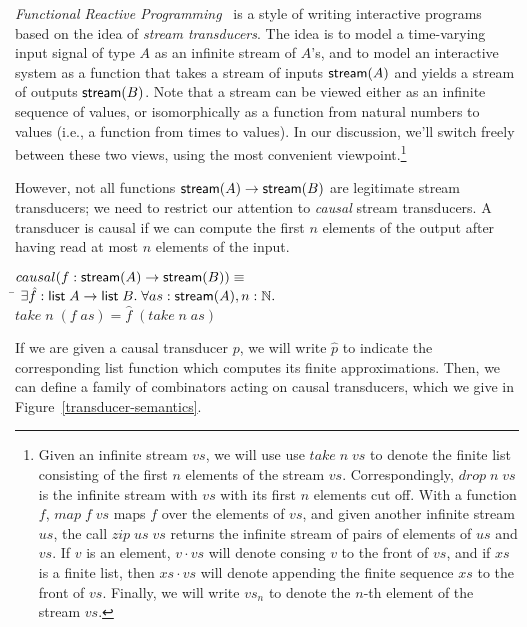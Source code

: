 \emph{Functional Reactive Programming}~\cite{frp} is a style of
writing interactive programs based on the idea of \emph{stream
  transducers}.  The idea is to model a time-varying input signal of
type $A$ as an infinite stream of $A$'s, and to model an interactive
system as a function that takes a stream of inputs $\mathsf{stream}({A})$ and
yields a stream of outputs $\mathsf{stream}({B})$. Note that a stream can be
viewed either as an infinite sequence of values, or isomorphically as
a function from natural numbers to values (i.e., a function from times
to values). In our discussion, we'll switch freely between these two
views, using the most convenient viewpoint.\footnote{Given an infinite stream $vs$, we will use use $take\;n\;vs$ to denote
the finite list consisting of the first $n$ elements of the stream
$vs$. Correspondingly, $drop\;n\;vs$ is the infinite stream with $vs$
with its first $n$ elements cut off. With a function $f$, $map\;f\;vs$
maps $f$ over the elements of $vs$, and given another infinite stream
$us$, the call $zip\;us\;vs$ returns the infinite stream of pairs of
elements of $us$ and $vs$. If $v$ is an element, $v \cdot vs$ will 
denote consing $v$ to the front of $vs$, and if $xs$ is a finite list, then
$xs \cdot vs$ will denote appending the finite sequence $xs$ to the
front of $vs$. Finally, we will write $vs_n$ to denote the $n$-th element
of the stream $vs$.}

However, not all functions $\mathsf{stream}({A}) \to \mathsf{stream}({B})$ are legitimate
stream transducers; we need to restrict our attention to \emph{causal}
stream transducers. A transducer is causal if we can compute the first
$n$ elements of the output after having read at most $n$ elements of
the input. 

\begin{tabbing}
$causal(f : \mathsf{stream}({A}) \to \mathsf{stream}({B})) \equiv$ \\
\;\;\= $\exists \hat{f} : \mathsf{list}\;{A} \to \mathsf{list}\;{B}.\;\forall as:\mathsf{stream}({A}), n:\mathbb{N}.$ \\
    \> \;\;$take\;n\;(f\;as) = \hat{f}\;(take\;n\;as)$ 
\end{tabbing}

If we are given a causal transducer $p$, we will write $\hat{p}$ to
indicate the corresponding list function which computes its finite
approximations. Then, we can define a family of combinators acting on
causal transducers, which we give in Figure~\ref{transducer-semantics}.

